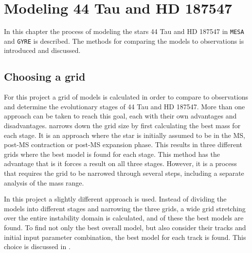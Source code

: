 \chapter{Modeling 44 Tau and HD 187547}
\label{modeling}
In this chapter the process of modeling the stars 44 Tau and HD 187547 in \texttt{MESA} and \texttt{GYRE} is described. The methods for comparing the models to  observations is introduced and discussed.

\section{Choosing a grid}
\label{sec:grid}
For this project a grid of models is calculated in order to compare to observations and determine the evolutionary stages of 44 Tau and HD 187547. More than one approach can be taken to reach this goal, each with their own advantages and disadvantages. \citet{lenz2010delta} narrows down the grid size by first calculating the best mass for each stage. It is an approach where the star is initially assumed to be in the MS, post-MS contraction or post-MS expansion phase. This results in three different grids where the best model is found for each stage. This method has the advantage that is it forces a result on all three stages. However, it is a process that requires the grid to be narrowed through several steps, including a separate analysis of the mass range.

In this project a slightly different approach is used. Instead of dividing the models into different stages and narrowing the three grids, a wide grid stretching over the entire instability domain is calculated, and of these the best models are found. To find not only the best overall model, but also consider their tracks and initial input parameter combination, the best model for each track is found. This choice is discussed in . 

